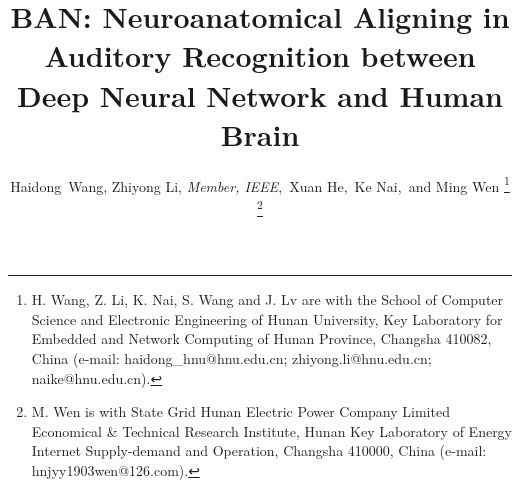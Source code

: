 \documentclass[journal]{IEEEtran}
\begin{document}
%
\title{BAN: Neuroanatomical Aligning in Auditory Recognition between Deep Neural Network and Human Brain}
%
%
%


\author{Haidong~Wang, Zhiyong Li, \emph{Member, IEEE},~Xuan He,~Ke Nai,~and Ming Wen%
	\thanks{H. Wang, Z. Li, K. Nai, S. Wang and J. Lv are with the School
		of Computer Science and Electronic Engineering of Hunan University, Key Laboratory for Embedded and Network Computing of Hunan Province, Changsha 410082,
		China (e-mail: haidong\_hnu@hnu.edu.cn; zhiyong.li@hnu.edu.cn;
		naike@hnu.edu.cn).}
	\thanks{M. Wen is with State Grid Hunan Electric Power Company Limited Economical \& Technical Research Institute, Hunan Key Laboratory of Energy Internet Supply-demand and Operation, Changsha 410000, China (e-mail: hnjyy1903wen@126.com).}
}


% 
%
\end{document}
